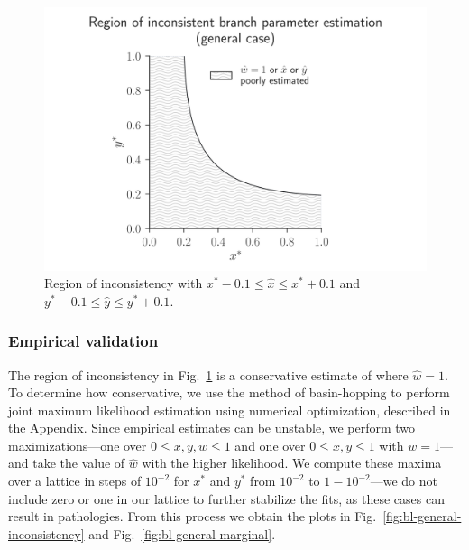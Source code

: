 \documentclass{article}
\begin{document}
\begin{figure}
\centering
\includegraphics[width=\textwidth]{bl-loose-inconsistency-inkscape}
\caption{Region of inconsistency with $x^*-0.1 \le \hat{x} \le x^*+0.1$ and $y^*-0.1 \le \hat{y} \le y^*+0.1$.}
\label{fig:bl-loose-inconsistency}
\end{figure}

\subsubsection*{Empirical validation}

The region of inconsistency in Fig.~\ref{fig:bl-loose-inconsistency} is a conservative estimate of where $\hat{w}=1$.
To determine how conservative, we use the method of basin-hopping \cite{Wales1997} to perform joint maximum likelihood estimation using numerical optimization, described in the Appendix.
Since empirical estimates can be unstable, we perform two maximizations---one over $0 \le x,y,w \le 1$ and one over $0 \le x,y \le 1$ with $w=1$---and take the value of $\hat{w}$ with the higher likelihood.
We compute these maxima over a lattice in steps of $10^{-2}$ for $x^*$ and $y^*$ from $10^{-2}$ to $1-10^{-2}$---we do not include zero or one in our lattice to further stabilize the fits, as these cases can result in pathologies.
From this process we obtain the plots in Fig.~\ref{fig:bl-general-inconsistency} and Fig.~\ref{fig:bl-general-marginal}.
\end{document}
